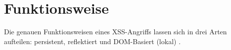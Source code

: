 \section{Funktionsweise}
Die genauen Funktionsweisen eines XSS-Angriffs lassen sich in drei Arten
aufteilen: persistent, reflektiert und DOM-Basiert (lokal) \cite{fSidI13}.



